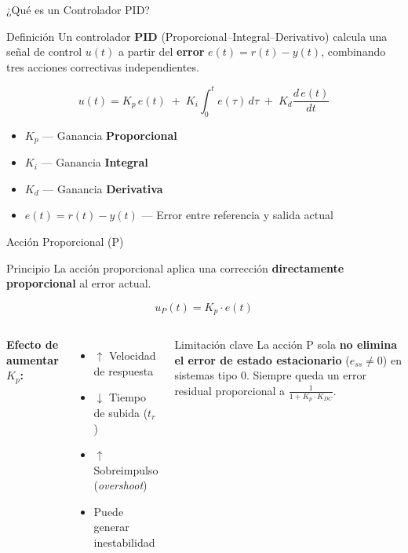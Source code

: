 \documentclass[aspectratio=169,xcolor=dvipsnames]{beamer}
\begin{document}
\begin{frame}{¿Qué es un Controlador PID?}
    \footnotesize
    \begin{block}{Definición}
        Un controlador \textbf{PID} (Proporcional--Integral--Derivativo) calcula una señal de control $u(t)$ a partir del \textbf{error} $e(t) = r(t) - y(t)$, combinando tres acciones correctivas independientes.
    \end{block}
    \vspace{0.4em}
    \begin{equation}
        u(t) = K_p \, e(t) \;+\; K_i \int_0^t e(\tau)\,d\tau \;+\; K_d \frac{d\,e(t)}{dt}
    \end{equation}
    \vspace{0.2em}
    \begin{itemize}
        \item $K_p$ --- Ganancia \textbf{Proporcional}
        \item $K_i$ --- Ganancia \textbf{Integral}
        \item $K_d$ --- Ganancia \textbf{Derivativa}
        \item $e(t) = r(t) - y(t)$ --- Error entre referencia y salida actual
    \end{itemize}
\end{frame}

\begin{frame}{Acción Proporcional (P)}
    \footnotesize
    \begin{block}{Principio}
        La acción proporcional aplica una corrección \textbf{directamente proporcional} al error actual.
    \end{block}
    \begin{equation}
        u_P(t) = K_p \cdot e(t)
    \end{equation}
    \begin{columns}
        \textbf{Efecto de aumentar $K_p$:}
        \begin{itemize}
            \item $\uparrow$ Velocidad de respuesta
            \item $\downarrow$ Tiempo de subida ($t_r$)
            \item $\uparrow$ Sobreimpulso (\textit{overshoot})
            \item Puede generar inestabilidad
        \end{itemize}
        \begin{alertblock}{Limitación clave}
            La acción P sola \textbf{no elimina el error de estado estacionario} ($e_{ss} \neq 0$) en sistemas tipo 0. Siempre queda un error residual proporcional a $\frac{1}{1+K_p \cdot K_{DC}}$.
        \end{alertblock}
    \end{columns}
\end{frame}
\end{document}
